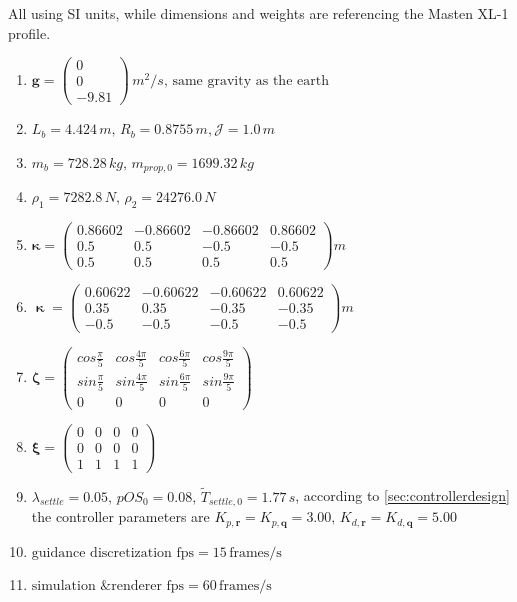 \documentclass[10pt]{elsarticle}
\begin{document}
All using SI units, while dimensions and weights are referencing the Masten XL-1 profile.
\footnotesize
\begin{enumerate}[label=\textbf{f.\arabic*}, itemsep=2pt]
    \item $\boldsymbol{g} = \begin{pmatrix} 0 \\ 0 \\ -9.81 \end{pmatrix} \, m^2/s, \, \text{same gravity as the earth}$    
    \item $L_b = 4.424 \, m, \, R_b = 0.8755 \, m, \mathcal{J} = 1.0 \, m$
    \item $m_b = 728.28 \, kg, \, m_{prop,0} = 1699.32 \, kg$
    \item $\rho_1 = 7282.8 \, N, \, \rho_2 = 24276.0 \, N$
    \item $\boldsymbol{\kappa} = \begin{pmatrix} 0.86602 & -0.86602 & -0.86602 & 0.86602 \\ 0.5 & 0.5 & -0.5 & -0.5 \\ 0.5 & 0.5 & 0.5 & 0.5 \end{pmatrix} m$
    \item $\boldsymbol{\upkappa} = \begin{pmatrix} 0.60622 & -0.60622 & -0.60622 & 0.60622 \\ 0.35 & 0.35 & -0.35 & -0.35 \\ -0.5 & -0.5 & -0.5 & -0.5 \end{pmatrix} m$
    \item \begingroup %
            \renewcommand*{\arraystretch}{1.5}
            $\boldsymbol{\zeta} = \begin{pmatrix} cos\frac{\pi}{5} & cos\frac{4\pi}{5} & cos\frac{6\pi}{5} & cos\frac{9\pi}{5} \\ sin\frac{\pi}{5} & sin\frac{4\pi}{5} & sin\frac{6\pi}{5} & sin\frac{9\pi}{5} \\ 0 & 0 & 0 & 0 \end{pmatrix}$
          \endgroup 
    \item $\boldsymbol{\xi} = \begin{pmatrix} 0 & 0 & 0 & 0 \\ 0 & 0 & 0 & 0 \\ 1 & 1 & 1 & 1 \end{pmatrix}$
    \item $\lambda_{settle} = 0.05, \, pOS_{0} = 0.08, \, \tilde{T}_{settle, 0} = 1.77 \, s$, according to \cref{sec:controllerdesign} the controller parameters are $K_{p,\boldsymbol{r}} = K_{p,\boldsymbol{q}} = 3.00, \, K_{d,\boldsymbol{r}} = K_{d,\boldsymbol{q}} = 5.00$
    \item $\text{guidance discretization fps} =  15 \, \text{frames/s}$
    \item $\text{simulation \& renderer fps} =  60 \, \text{frames/s}$
\end{enumerate}
\normalsize
\end{document}
